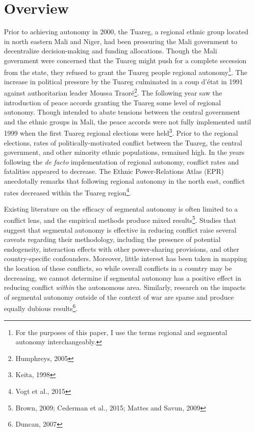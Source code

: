 \documentclass[12pt]{elsarticle}
\begin{document}

\section{Overview}

Prior to achieving autonomy in 2000, the Tuareg, a regional ethnic group located in north eastern Mali and Niger, had been pressuring the Mali government to decentralize decision-making and funding allocations. Though the Mali government were concerned that the Tuareg might push for a complete secession from the state, they refused to grant the Tuareg people regional autonomy\footnote{For the purposes of this paper, I use the terms regional and segmental autonomy interchangeably.}. The increase in political pressure by the Tuareg culminated in a coup d’état in 1991 against authoritarian leader Moussa Traoré\footnote{Humphreys, 2005}. The following year saw the introduction of peace accords granting the Tuareg some level of regional autonomy. Though intended to abate tensions between the central government and the ethnic groups in Mali, the peace accords were not fully implemented until 1999 when the first Tuareg regional elections were held\footnote{Keita, 1998}. Prior to the regional elections, rates of politically-motivated conflict between the Tuareg, the central government, and other minority ethnic populations, remained high. In the years following the \textit{de facto} implementation of regional autonomy, conflict rates and fatalities appeared to decrease. The Ethnic Power-Relations Atlas (EPR) anecdotally remarks that following regional autonomy in the north east, conflict rates decreased within the Tuareg region\footnote{Vogt et al., 2015}.

Existing literature on the efficacy of segmental autonomy is often limited to a conflict lens, and the empirical methods produce mixed results\footnote{Brown, 2009; Cederman et al., 2015; Mattes and Savun, 2009}. Studies that suggest that segmental autonomy is effective in reducing conflict raise several caveats regarding their methodology, including the presence of potential endogeneity, interaction effects with other power-sharing provisions, and other country-specific confounders. Moreover, little interest has been taken in mapping the location of these conflicts, so while overall conflicts in a country may be decreasing, we cannot determine if segmental autonomy has a positive effect in reducing conflict \textit{within} the autonomous area. Similarly, research on the impacts of segmental autonomy outside of the context of war are sparse and produce equally dubious results\footnote{Duncan, 2007}. 
\end{document}
